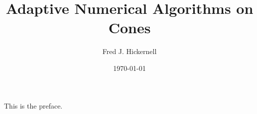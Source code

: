 \documentclass{SIAMbook2019_FJH}
\title{Adaptive Numerical Algorithms on Cones}
\author{Fred J. Hickernell}
\date{\today}
\begin{document}
\maketitle
\frontmatter
\tableofcontents

\begin{contributors}
\end{contributors}

\listoffigures
\listoftables
\listofproblems
\listofalgorithms

\begin{thepreface}
This is the preface.
\end{thepreface}

\mainmatter










\cleardoublepage

\printindex
\end{document}
